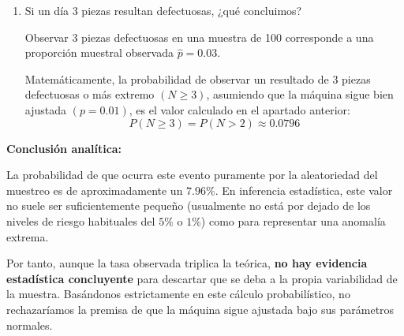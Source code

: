 \begin{enumerate}[label=\color{red}\textbf{\arabic*)}]
\begin{enumerate}[label=\alph*)]
		            Buscamos la probabilidad $P(\hat{p}>0.02)$.

		            Dado que $n=100$, esto equivale a tener más de 2 piezas defectuosas en la muestra: \[
			            P(\hat{p}>0.02)=P \left( \dfrac{N}{100}>0.02 \right) =P(N>2)
		            \]
		            Para un experimento simple dicotómico repetido $n$ veces, la distribución de $N$ es exactamente una distribución Binomical: $N\sim \mathcal{B}(n,p)$.

		            Calculamos la probabilidad exacta: \[
			            P(N>2)=1-P(N\le 2)=1-[P(N=0)+P(N=1)+P(N=2)]
		            \]
		            Sabiendo que $P(N=k)=\dbinom{n}{k} p^k(1-p)^{n-k}$, sustituimos $n=100$ y $p=0.01$:
		            \begin{itemize}[label=\textbullet]
			            \item $P(N=0)=\dbinom{100}{0} (0.01)^0(0.99)^{100}\approx 0.366$
			            \item $P(N=1)=\dbinom{100}{1} (0.01)^1(0.99)^{99}\approx 0.3697$
			            \item $P(N=2)=\dbinom{100}{2} (0.01)^2(0.99)^{98}\approx 0.1847$
		            \end{itemize}
		            Sumamos las probabilidades acumuladas:
		            \[
			            P(N\le 2)\approx 0.3360+0.3697+0.1847=0.9204
		            \]
		            Por lo tanto, la probabilidad de encontrar más del $2\%$ de piezas defectuosas es: \[
			            P(\hat{p}>0.02)=1-0.9204=0.0796
		            \]
		      \item Si un día 3 piezas resultan defectuosas, ¿qué concluimos?

		            Observar 3 piezas defectuosas en una muestra de 100 corresponde a una proporción muestral observada $\hat{p}=0.03$.

		            Matemáticamente, la probabilidad de observar un resultado de 3 piezas defectuosas o más extremo $(N\ge 3)$, asumiendo que la máquina sigue bien ajustada $(p=0.01)$, es el valor calculado en el apartado anterior: \[
			            P(N\ge 3)=P(N>2)\approx 0.0796
		            \]
	      \end{enumerate}
	      \textbf{Conclusión analítica:}

	      La probabilidad de que ocurra este evento puramente por la aleatoriedad del muestreo es de aproximadamente un $7.96\%$. En inferencia estadística, este valor no suele ser suficientemente pequeño (usualmente no está por dejado de los niveles de riesgo habituales del $5\%$ o $1\%$) como para representar una anomalía extrema.

	      Por tanto, aunque la tasa observada triplica la teórica, \textbf{no hay evidencia estadística concluyente} para descartar que se deba a la propia variabilidad de la muestra. Basándonos estrictamente en este cálculo probabilístico, no rechazaríamos la premisa de que la máquina sigue ajustada bajo sus parámetros normales.
\end{enumerate}
